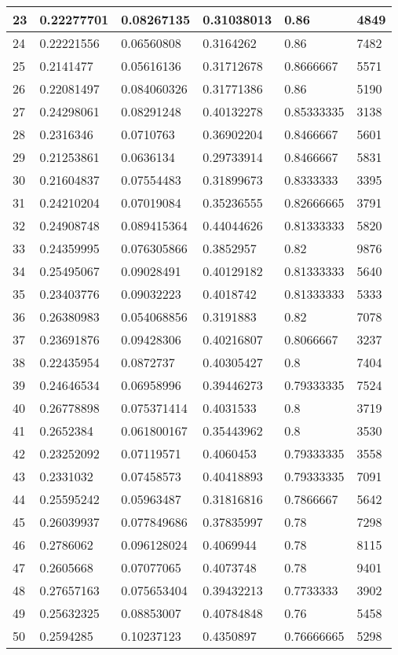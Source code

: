 \begin{longtable}{|l|l|l|l|l|l|}
23 & 0.22277701 & 0.08267135 & 0.31038013 & 0.86 & 4849 \\ \hline 
24 & 0.22221556 & 0.06560808 & 0.3164262 & 0.86 & 7482 \\ \hline 
25 & 0.2141477 & 0.05616136 & 0.31712678 & 0.8666667 & 5571 \\ \hline 
26 & 0.22081497 & 0.084060326 & 0.31771386 & 0.86 & 5190 \\ \hline 
27 & 0.24298061 & 0.08291248 & 0.40132278 & 0.85333335 & 3138 \\ \hline 
28 & 0.2316346 & 0.0710763 & 0.36902204 & 0.8466667 & 5601 \\ \hline 
29 & 0.21253861 & 0.0636134 & 0.29733914 & 0.8466667 & 5831 \\ \hline 
30 & 0.21604837 & 0.07554483 & 0.31899673 & 0.8333333 & 3395 \\ \hline 
31 & 0.24210204 & 0.07019084 & 0.35236555 & 0.82666665 & 3791 \\ \hline 
32 & 0.24908748 & 0.089415364 & 0.44044626 & 0.81333333 & 5820 \\ \hline 
33 & 0.24359995 & 0.076305866 & 0.3852957 & 0.82 & 9876 \\ \hline 
34 & 0.25495067 & 0.09028491 & 0.40129182 & 0.81333333 & 5640 \\ \hline 
35 & 0.23403776 & 0.09032223 & 0.4018742 & 0.81333333 & 5333 \\ \hline 
36 & 0.26380983 & 0.054068856 & 0.3191883 & 0.82 & 7078 \\ \hline 
37 & 0.23691876 & 0.09428306 & 0.40216807 & 0.8066667 & 3237 \\ \hline 
38 & 0.22435954 & 0.0872737 & 0.40305427 & 0.8 & 7404 \\ \hline 
39 & 0.24646534 & 0.06958996 & 0.39446273 & 0.79333335 & 7524 \\ \hline 
40 & 0.26778898 & 0.075371414 & 0.4031533 & 0.8 & 3719 \\ \hline 
41 & 0.2652384 & 0.061800167 & 0.35443962 & 0.8 & 3530 \\ \hline 
42 & 0.23252092 & 0.07119571 & 0.4060453 & 0.79333335 & 3558 \\ \hline 
43 & 0.2331032 & 0.07458573 & 0.40418893 & 0.79333335 & 7091 \\ \hline 
44 & 0.25595242 & 0.05963487 & 0.31816816 & 0.7866667 & 5642 \\ \hline 
45 & 0.26039937 & 0.077849686 & 0.37835997 & 0.78 & 7298 \\ \hline 
46 & 0.2786062 & 0.096128024 & 0.4069944 & 0.78 & 8115 \\ \hline 
47 & 0.2605668 & 0.07077065 & 0.4073748 & 0.78 & 9401 \\ \hline 
48 & 0.27657163 & 0.075653404 & 0.39432213 & 0.7733333 & 3902 \\ \hline 
49 & 0.25632325 & 0.08853007 & 0.40784848 & 0.76 & 5458 \\ \hline 
50 & 0.2594285 & 0.10237123 & 0.4350897 & 0.76666665 & 5298 \\ \hline 
\end{longtable}